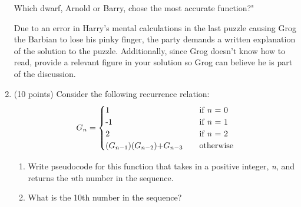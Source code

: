 \documentclass[12pt]{article}
\begin{document}
\begin{enumerate}
\begin{center}
\begin{tabular}{|c | c |}
        \end{tabular}
    \end{center}

    Which dwarf, Arnold or Barry, chose the most accurate function?"

    \normalsize
    Due to an error in Harry's mental calculations in the last puzzle causing Grog the Barbian to lose his pinky finger, the party demands  a written explanation of the solution to the puzzle. Additionally, since Grog doesn't know how to read, provide a relevant figure in your solution so Grog can believe he is part of the discussion.

    \newpage

 	\item (10 points) Consider the following recurrence relation:
\[
G_n =
     \begin{cases}
       \text{1} &\quad\text{if \textit{n} = 0}\\
       \text{-1} &\quad\text{if \textit{n} = 1}\\
       \text{2} &\quad\text{if \textit{n} = 2}\\
       \text{($G_{n-1}$)($G_{n-2}$)+$G_{n-3}$} &\quad\text{otherwise}\\
     \end{cases}
\]

 	\begin{enumerate}
 	\item Write pseudocode for this function that takes in a positive integer, \textit{n}, and returns the \textit{n}th number in the sequence.
 	\item What is the 10th number in the sequence?
 	\end{enumerate}


\lhead{ }
\rhead{}
\renewcommand{\headrulewidth}{0pt}

\end{enumerate}
\end{document}
